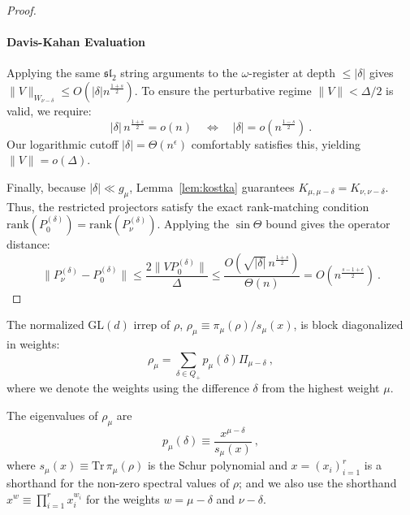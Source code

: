 \documentclass[11pt,letterpaper]{article}
\newcommand*{\Tr}{\mathrm{Tr}}
\begin{document}
\begin{proof}
\paragraph{Davis-Kahan Evaluation}
Applying the same $\mathfrak{sl}_2$ string arguments to the $\omega$-register at depth $\le |\delta|$ gives $\|V\|_{W_{\nu-\delta}} \le O(|\delta| n^{\frac{1+s}{2}})$. To ensure the perturbative regime $\|V\| < \Delta / 2$ is valid, we require:
\begin{equation}
    |\delta| \, n^{\frac{1+s}{2}} = o(n) \quad \Longleftrightarrow \quad |\delta| = o\left(n^{\frac{1-s}{2}}\right) \ .
\end{equation}
Our logarithmic cutoff $|\delta| =\Theta(n^\epsilon)$ comfortably satisfies this, yielding $\|V\| = o(\Delta)$.

Finally, because $|\delta| \ll g_\mu$, Lemma~\ref{lem:kostka} guarantees $K_{\mu, \mu-\delta} = K_{\nu, \nu-\delta}$. Thus, the restricted projectors satisfy the exact rank-matching condition $\mathrm{rank}(P_0^{(\delta)}) = \mathrm{rank}(P_\nu^{(\delta)})$. Applying the $\sin \Theta$ bound gives the operator distance:
\begin{equation}
    \|P_\nu^{(\delta)} - P_0^{(\delta)}\| \le \frac{2 \|V P_0^{(\delta)}\|}{\Delta} \le \frac{O\left( \sqrt{|\delta|} \, n^{\frac{1+s}{2}} \right)}{\Theta(n)} = O\left( n^{\frac{s-1+\epsilon}{2}} \right) \ .
\end{equation}
\end{proof}

The normalized GL$(d)$ irrep of $\rho$, $\rho_\mu\equiv\pi_\mu(\rho)/s_\mu(x)$, is block diagonalized in weights:
\begin{equation}
    \rho_\mu = \sum_{\delta\in Q_+} p_\mu(\delta) \Pi_{\mu-\delta}\ ,
\end{equation}
where we denote the weights using the difference $\delta$ from the highest weight $\mu$.

The eigenvalues of $\rho_\mu$ are
\begin{equation}
    p_\mu(\delta)\equiv\frac{x^{\mu-\delta}}{s_\mu(x)}\ ,
\end{equation}
where $s_{\mu}(x)\equiv\Tr\, \pi_{\mu}(\rho)$ is the Schur polynomial and $x=(x_i)_{i=1}^r$ is a shorthand for the non-zero spectral values of $\rho$; and we also use the shorthand $x^{w}\equiv\prod_{i=1}^r x_i^{w_i}$ for the weights $w=\mu-\delta$ and $\nu-\delta$.
\end{document}
